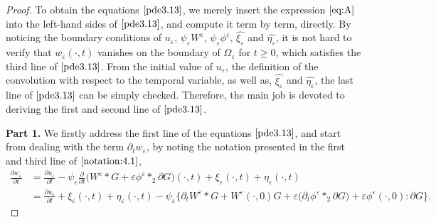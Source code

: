 \documentclass[13pt,CJK]{article}
\theoremstyle{plain}                       %
\theoremstyle{remark}
\numberwithin{equation}{section}
\begin{document}
\begin{proof}
To obtain the equations $\eqref{pde3.13}$, we merely insert
the expression $\eqref{eq:A}$ into the left-hand sides of
$\eqref{pde3.13}$, and compute it term by term, directly.
By noticing the boundary conditions of $u_\varepsilon$,
$\psi_\varepsilon W^\varepsilon$, $\psi_\varepsilon\phi^\varepsilon$, $\hat{\xi_{\varepsilon}}$ and
$\hat{\eta_{\varepsilon}}$, it is not hard to verify that $w_\varepsilon(\cdot,t)$ vanishes on the
boundary of $\Omega_\varepsilon$ for $t\geq 0$, which satisfies
the third line of $\eqref{pde3.13}$. From the initial value
of $u_\varepsilon$, the definition of the convolution with respect to the temporal variable, as well as, $\hat{\xi_{\varepsilon}}$ and
$\hat{\eta_{\varepsilon}}$, the last line of $\eqref{pde3.13}$ can be simply checked. Therefore,
the main job is devoted to deriving the first and second line of $\eqref{pde3.13}$.

\medskip

\textbf{Part 1.}
We firstly address the first line of the equations $\eqref{pde3.13}$,
and start from dealing with the term $\partial_t w_{\varepsilon}$,
by noting the notation presented in the first and third line of $\eqref{notation:4.1}$,
\begin{equation}\label{f:4.2}
\begin{aligned}
\frac{\partial w_{\varepsilon}}{\partial t}
&=
\frac{\partial u_{\varepsilon}}{\partial t}-
\psi_{\varepsilon}\frac{\partial}{\partial t}
\big(W^{\varepsilon}\ast G+\varepsilon \phi^{\varepsilon}\ast_2
\partial G\big)(\cdot,t)
+\xi_{\varepsilon}(\cdot,t)
+\eta_{\varepsilon}(\cdot,t)\\
&=\frac{\partial u_{\varepsilon}}{\partial t}
+\xi_{\varepsilon}(\cdot,t)
+\eta_{\varepsilon}(\cdot,t)
-\psi_{\varepsilon}
\bigg\{\partial_tW^{\varepsilon}\ast G +W^{\varepsilon}(\cdot,0)G+\varepsilon \big(\partial_t\phi^{\varepsilon}\ast_2\partial G\big)
+\varepsilon \phi^{\varepsilon}(\cdot,0):\partial G
\bigg\}.
\end{aligned}
\end{equation}

\medskip


\end{proof}
\end{document}
